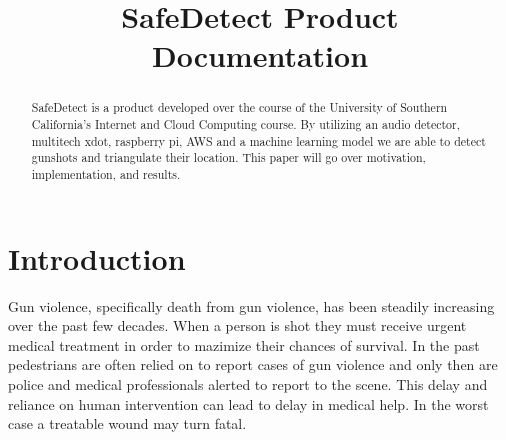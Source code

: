 \documentclass[conference]{IEEEtran}
\begin{document}
\title{SafeDetect Product Documentation\\
}

\author{
\and
{}
\and
{}
\and
{}

}

\maketitle

\begin{abstract}
SafeDetect is a product developed over the course of the University of Southern California's Internet and Cloud Computing course. By utilizing an audio detector, multitech xdot, raspberry pi, AWS and a machine learning model we are able to detect gunshots and triangulate their location. This paper will go over motivation, implementation, and results.
\end{abstract}


\section{Introduction}
Gun violence, specifically death from gun violence, has been steadily increasing over the past few decades. When a person is shot they must receive urgent medical treatment in order to mazimize their chances of survival. In the past pedestrians are often relied on to report cases of gun violence and only then are police and medical professionals alerted to report to the scene. This delay and reliance on human intervention can lead to delay in medical help. In the worst case a treatable wound may turn fatal.
\end{document}
